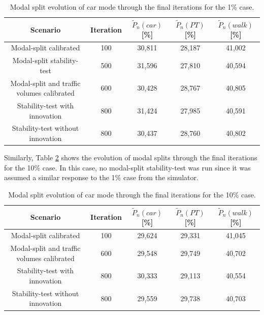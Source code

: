 \documentclass[Journal,letterpaper]{ascelike-new}
\begin{document}
\begin{table}
	\caption{Modal split evolution of car mode through the final iterations for the 1\% case.}
	\label{table:1pct_modalSplitEvolution}
	\begin{tabular}{ccccc}
		\hline	
		Scenario & Iteration & $\tilde{P}_{n}(car)$ [\%] &  $\tilde{P}_{n}(PT)$ [\%]&$\tilde{P}_{n}(walk)$ [\%] \\
		\hline
		Modal-split calibrated						& 100 & 30,811 & 28,187 & 41,002 \\
		Modal-split stability-test					& 500 & 31,596 & 27,810 & 40,594 \\
		Modal-split and traffic volumes calibrated	& 600 & 30,428 & 28,767 & 40,805 \\
		Stability-test with innovation				& 800 & 31,424 & 27,985 & 40,591 \\
		Stability-test without innovation			& 800 & 30,437 & 28,760 & 40,802 \\
		\hline
	\end{tabular}
\end{table}

Similarly, Table \ref{table:10pct_modalSplitEvolution} shows the evolution of modal splits through the final iterations for the 10\% case. In this case, no modal-split stability-test was run since it was assumed a similar response to the 1\% case from the simulator.

\begin{table}
	\caption{Modal split evolution of car mode through the final iterations for the 10\% case.}
	\label{table:10pct_modalSplitEvolution}
	\begin{tabular}{ccccc}
		\hline	
		Scenario & Iteration & $\tilde{P}_{n}(car)$ [\%] &  $\tilde{P}_{n}(PT)$ [\%]&$\tilde{P}_{n}(walk)$ [\%] \\
		\hline
		Modal-split calibrated						& 100 & 29,624 & 29,331 & 41,045 \\
		Modal-split and traffic volumes calibrated	& 600 & 29,548 & 29,749 & 40,702 \\
		Stability-test with innovation				& 800 & 30,333 & 29,113 & 40,554 \\
		Stability-test without innovation			& 800 & 29,559 & 29,738 & 40,703 \\
		\hline
	\end{tabular}
\end{table}
\end{document}
